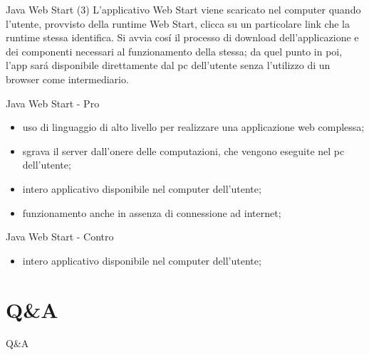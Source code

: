 \documentclass{beamer}
\begin{document}
\begin{frame}{Java Web Start (3)}
L'applicativo Web Start viene scaricato nel computer quando l'utente, provvisto della runtime Web Start, clicca su un particolare
link che la runtime stessa identifica. Si avvia cos\'i il processo di download dell'applicazione e dei componenti necessari al 
funzionamento della stessa; da quel punto in poi, l'app sar\'a disponibile direttamente dal pc dell'utente senza l'utilizzo di un
browser come intermediario.
\end{frame}

\begin{frame}{Java Web Start - Pro}
\begin{itemize}
\item uso di linguaggio di alto livello per realizzare una applicazione web complessa;
\item sgrava il server dall'onere delle computazioni, che vengono eseguite nel pc dell'utente;
\item intero applicativo disponibile nel computer dell'utente;
\item funzionamento anche in assenza di connessione ad internet;
\end{itemize}
\end{frame}

\begin{frame}{Java Web Start - Contro}
\begin{itemize}
\item intero applicativo disponibile nel computer dell'utente;
\end{itemize}
\end{frame}

\section{Q\&A}
\begin{frame}{Q\&A}
\end{frame}
\end{document}
